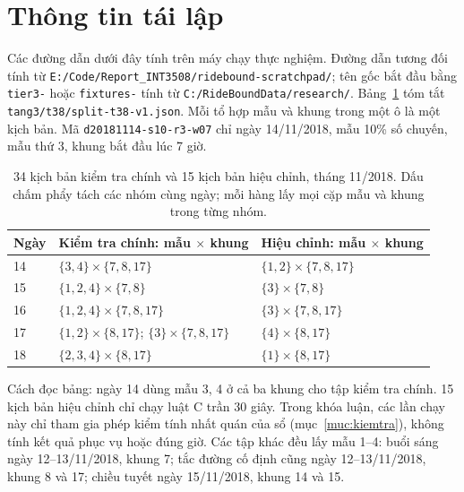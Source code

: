 \section{Thông tin tái lập}
\label{phuluc:C}
\setcounter{table}{0}

Các đường dẫn dưới đây tính trên máy chạy thực nghiệm. Đường dẫn tương đối tính từ \nolinkurl{E:/Code/Report_INT3508/ridebound-scratchpad/}; tên gốc bắt đầu bằng \texttt{tier3-} hoặc \texttt{fixtures-} tính từ \nolinkurl{C:/RideBoundData/research/}. Bảng~\ref{bang:pl-danhsach} tóm tắt \nolinkurl{tang3/t38/split-t38-v1.json}. Mỗi tổ hợp mẫu và khung trong một ô là một kịch bản. Mã \nolinkurl{d20181114-s10-r3-w07} chỉ ngày 14/11/2018, mẫu 10\% số chuyến, mẫu thứ 3, khung bắt đầu lúc 7 giờ.

\begin{table}[htbp]
\centering
\caption{34 kịch bản kiểm tra chính và 15 kịch bản hiệu chỉnh, tháng 11/2018. Dấu chấm phẩy tách các nhóm cùng ngày; mỗi hàng lấy mọi cặp mẫu và khung trong từng nhóm.}
\label{bang:pl-danhsach}
\begin{tabular}{@{}p{1.5cm}p{6.8cm}p{6.5cm}@{}}
\toprule
\textbf{Ngày} & \textbf{Kiểm tra chính: mẫu $\times$ khung} & \textbf{Hiệu chỉnh: mẫu $\times$ khung} \\
\midrule
14 & $\{3,4\}\times\{7,8,17\}$ & $\{1,2\}\times\{7,8,17\}$ \\
15 & $\{1,2,4\}\times\{7,8\}$ & $\{3\}\times\{7,8\}$ \\
16 & $\{1,2,4\}\times\{7,8,17\}$ & $\{3\}\times\{7,8,17\}$ \\
17 & $\{1,2\}\times\{8,17\}$; $\{3\}\times\{7,8,17\}$ & $\{4\}\times\{8,17\}$ \\
18 & $\{2,3,4\}\times\{8,17\}$ & $\{1\}\times\{8,17\}$ \\
\bottomrule
\end{tabular}
\end{table}

Cách đọc bảng: ngày 14 dùng mẫu 3, 4 ở cả ba khung cho tập kiểm tra chính. 15 kịch bản hiệu chỉnh chỉ chạy luật C trần 30 giây. Trong khóa luận, các lần chạy này chỉ tham gia phép kiểm tính nhất quán của sổ (mục~\ref{muc:kiemtra}), không tính kết quả phục vụ hoặc đúng giờ. Các tập khác đều lấy mẫu 1--4: buổi sáng ngày 12--13/11/2018, khung 7; tắc đường cố định cũng ngày 12--13/11/2018, khung 8 và 17; chiều tuyết ngày 15/11/2018, khung 14 và 15.

